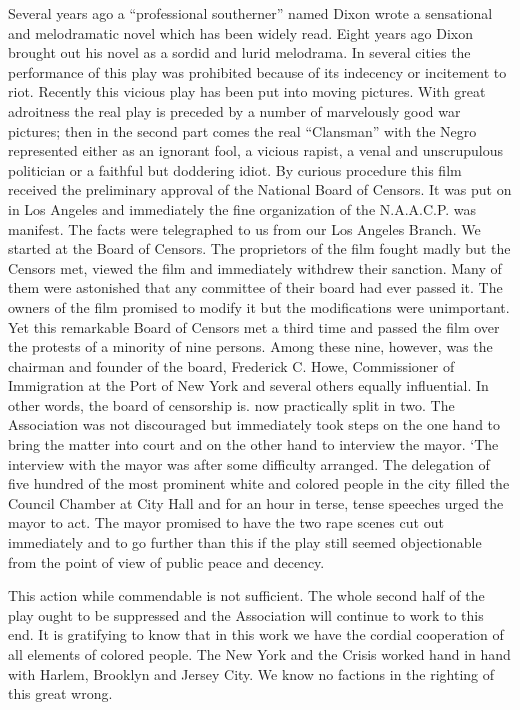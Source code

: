 \documentclass[letterpaper,10pt,english]{jupyterBook}
\begin{document}
\sphinxAtStartPar
Several years ago a “professional southerner” named Dixon wrote a sensational and melodramatic novel which has been widely read. Eight years ago Dixon brought out his novel as a sordid and lurid melodrama. In several cities the performance of this play was prohibited because of its indecency or incitement to riot. Recently this vicious play has been put into moving pictures. With great adroitness the real play is preceded by a number of marvelously good war pictures; then in the second part comes the real “Clansman” with the Negro represented either as an ignorant fool, a vicious rapist, a venal and unscrupulous politician or a faithful but doddering idiot. By curious procedure this film received the preliminary approval of the National Board of Censors. It was put on in Los Angeles and immediately the fine organization of the N.A.A.C.P. was manifest. The facts were telegraphed to us from our Los Angeles Branch. We started at the Board of Censors. The proprietors of the film fought madly but the Censors met, viewed the film and immediately withdrew their sanction. Many of them were astonished that any committee of their board had ever passed it. The owners of the film promised to modify it but the modifications were unimportant. Yet this remarkable Board of Censors met a third time and passed the film over the protests of a minority of nine persons. Among these nine, however, was the chairman and founder of the board, Frederick C. Howe, Commissioner of Immigration at the Port of New York and several others equally influential. In other words, the board of censorship is. now practically split in two. The Association was not discouraged but immediately took steps on the one hand to bring the matter into court and on the other hand to interview the mayor. ‘The interview with the mayor was after some difficulty arranged. The delegation of five hundred of the most prominent white and colored people in the city filled the Council Chamber at City Hall and for an hour in terse, tense speeches urged the mayor to act. The mayor promised to have the two rape scenes cut out immediately and to go further than this if the play still seemed objectionable from the point of view of public peace and decency.

\sphinxAtStartPar
This action while commendable is not sufficient. The whole second half of the play ought to be suppressed and the Association will continue to work to this end. It is gratifying to know that in this work we have the cordial co\sphinxhyphen{}operation of all elements of colored people. The New York  and the Crisis worked hand in hand with Harlem, Brooklyn and Jersey City. We know no factions in the righting of this great wrong.
\end{document}
